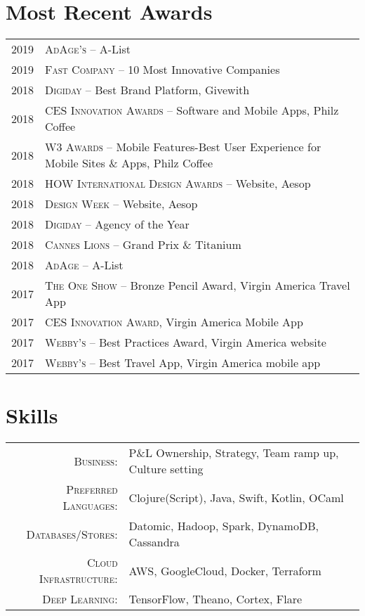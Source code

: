 \documentclass[a4paper,10pt]{article}
\begin{document}
\section{Most Recent Awards}
\begin{tabular}{rl}
  \textsc{2019} & \textsc{AdAge's} -- A-List \\
  \textsc{2019} & \textsc{Fast Company} -- 10 Most Innovative Companies \\
  \textsc{2018} & \textsc{Digiday} -- Best Brand Platform, Givewith \\
  \textsc{2018} & \textsc{CES Innovation Awards} -- Software and Mobile Apps, Philz Coffee \\
  \textsc{2018} & \textsc{W3 Awards} -- Mobile Features-Best User Experience for Mobile Sites \& Apps, Philz Coffee \\
  \textsc{2018} & \textsc{HOW International Design Awards} -- Website, Aesop \\
  \textsc{2018} & \textsc{Design Week} -- Website, Aesop \\
  \textsc{2018} & \textsc{Digiday} -- Agency of the Year \\
  \textsc{2018} & \textsc{Cannes Lions} -- Grand Prix \& Titanium \\
  \textsc{2018} & \textsc{AdAge} -- A-List \\
  \textsc{2017} & \textsc{The One Show} -- Bronze Pencil Award, Virgin America Travel App \\
  \textsc{2017} & \textsc{CES Innovation Award}, Virgin America Mobile App \\
  \textsc{2017} & \textsc{Webby's} -- Best Practices Award, Virgin America website \\
  \textsc{2017} & \textsc{Webby's} -- Best Travel App, Virgin America mobile app \\
\end{tabular}

\section{Skills}
\begin{tabular}{rl}
  \textsc{Business:} & P\&L Ownership, Strategy, Team ramp up, Culture setting \\

  \textsc{Preferred Languages:} & Clojure(Script), Java, Swift, Kotlin, OCaml \\

  \textsc{Databases/Stores:} & Datomic, Hadoop, Spark, DynamoDB, Cassandra \\

  \textsc{Cloud Infrastructure:} & AWS, GoogleCloud, Docker, Terraform \\

  \textsc{Deep Learning:} & TensorFlow, Theano, Cortex, Flare \\
\end{tabular}
\end{document}
